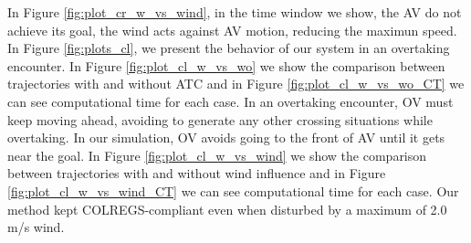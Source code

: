          
        In Figure \ref{fig:plot_cr_w_vs_wind}, in the time window we show, the \ac{AV} do not achieve its goal, the wind acts against \ac{AV} motion, reducing the maximun speed.
        In Figure \ref{fig:plots_cl}, we present the behavior of our system in an overtaking encounter. In Figure \ref{fig:plot_cl_w_vs_wo} we show the comparison between trajectories with and without \ac{ATC} and in Figure \ref{fig:plot_cl_w_vs_wo_CT} we can see computational time for each case. In an overtaking encounter, \ac{OV} must keep moving ahead, avoiding to generate any other crossing situations while overtaking. In our simulation, \ac{OV} avoids going to the front of \ac{AV} until it gets near the goal.
        In Figure \ref{fig:plot_cl_w_vs_wind} we show the comparison between trajectories with and without wind influence and in Figure \ref{fig:plot_cl_w_vs_wind_CT} we can see computational time for each case. Our method kept COLREGS-compliant even when disturbed by a maximum of 2.0 m/s wind.
